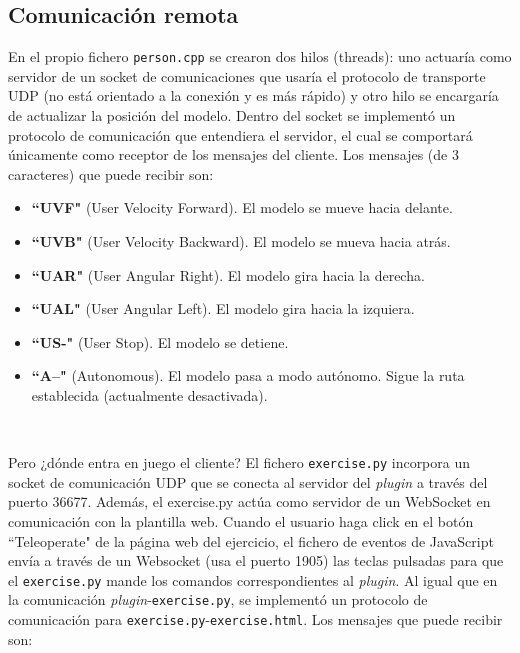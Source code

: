 \subsection{Comunicación remota}
\label{subsec:comunicacion_remota}

En el propio fichero \texttt{person.cpp} se crearon dos hilos (threads): uno actuaría como servidor de un socket de comunicaciones que usaría el protocolo de transporte UDP (no está orientado a la conexión y es más rápido) y otro hilo se encargaría de actualizar la posición del modelo. Dentro del socket se implementó un protocolo de comunicación que entendiera el servidor, el cual se comportará únicamente como receptor de los mensajes del cliente. Los mensajes (de 3 caracteres) que puede recibir son:\\

\begin{itemize}
	\item \textbf{``UVF"} (User Velocity Forward). El modelo se mueve hacia delante.
	\item \textbf{``UVB"} (User Velocity Backward). El modelo se mueva hacia atrás.
	\item \textbf{``UAR"} (User Angular Right). El modelo gira hacia la derecha.
	\item \textbf{``UAL"} (User Angular Left). El modelo gira hacia la izquiera.
	\item \textbf{``US-"} (User Stop). El modelo se detiene.
	\item \textbf{``A--"} (Autonomous). El modelo pasa a modo autónomo. Sigue la ruta establecida (actualmente desactivada).
\end{itemize}\

Pero ¿dónde entra en juego el cliente? El fichero \texttt{exercise.py} incorpora un socket de comunicación UDP que se conecta al servidor del \textit{plugin} a través del puerto 36677. Además, el exercise.py actúa como servidor de un WebSocket en comunicación con la plantilla web. Cuando el usuario haga click en el botón ``Teleoperate" de la página web del ejercicio, el fichero de eventos de JavaScript envía a través de un Websocket (usa el puerto 1905) las teclas pulsadas para que el \texttt{exercise.py} mande los comandos correspondientes al \textit{plugin}. Al igual que en la comunicación \textit{plugin}-\texttt{exercise.py}, se implementó un protocolo de comunicación para \texttt{exercise.py}-\texttt{exercise.html}. Los mensajes que puede recibir son:\\

